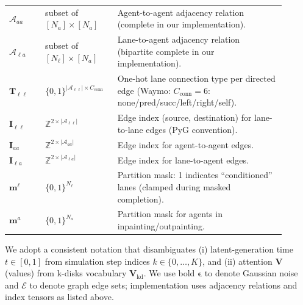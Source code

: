 \documentclass{article}
\theoremstyle{plain}
\theoremstyle{definition}
\theoremstyle{remark}
\begin{document}
\begin{table}[ht]
\begin{tabular}{p{0.12\linewidth}p{0.22\linewidth}p{0.56\linewidth}}
\(\mathcal{A}_{aa}\) & subset of \([N_{a}]\times[N_{a}]\) & Agent-to-agent adjacency relation (complete in our implementation). \\
\(\mathcal{A}_{\ell a}\) & subset of \([N_{\ell}]\times[N_{a}]\) & Lane-to-agent adjacency relation (bipartite complete in our implementation). \\
\(\mathbf{T}_{\ell\ell}\) & \(\{0,1\}^{|\mathcal{A}_{\ell\ell}|\times C_{\text{conn}}}\) & One-hot lane connection type per directed edge (Waymo: \(C_{\text{conn}}{=}6\): none/pred/succ/left/right/self). \\
\(\mathbf{I}_{\ell\ell}\) & \(\mathbb{Z}^{2\times |\mathcal{A}_{\ell\ell}|}\) & Edge index (source, destination) for lane-to-lane edges (PyG convention). \\
\(\mathbf{I}_{aa}\) & \(\mathbb{Z}^{2\times |\mathcal{A}_{aa}|}\) & Edge index for agent-to-agent edges. \\
\(\mathbf{I}_{\ell a}\) & \(\mathbb{Z}^{2\times |\mathcal{A}_{\ell a}|}\) & Edge index for lane-to-agent edges. \\
\(\mathbf{m}^{\ell}\) & \(\{0,1\}^{N_{\ell}}\) & Partition mask: 1 indicates ``conditioned'' lanes (clamped during masked completion). \\
\(\mathbf{m}^{a}\) & \(\{0,1\}^{N_{a}}\) & Partition mask for agents in inpainting/outpainting. \\
\bottomrule
\end{tabular}
\end{table}

We adopt a consistent notation that disambiguates (i) latent-generation time \(t\in[0,1]\) from simulation step indices
\(k\in\{0,\dots,K\}\), and (ii) attention \(\mathbf{V}\) (values) from k-disks vocabulary \(\mathbf{V}_{\mathrm{kd}}\).
We use bold \(\boldsymbol{\epsilon}\) to denote Gaussian noise and \(\mathcal{E}\) to denote graph edge sets; implementation uses adjacency relations and index tensors as listed above.
\end{document}
